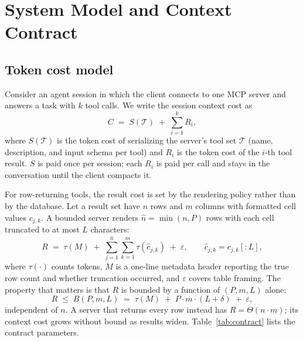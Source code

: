 \section{System Model and Context Contract}\label{sec:system-model}

\subsection{Token cost model}

Consider an agent session in which the client connects to one MCP server and answers a task with $k$ tool calls. We write the session context cost as
\begin{equation}
C \;=\; S(\mathcal{T}) \;+\; \sum_{i=1}^{k} R_i ,
\label{eq:session}
\end{equation}
where $S(\mathcal{T})$ is the token cost of serializing the server's tool set $\mathcal{T}$ (name, description, and input schema per tool) and $R_i$ is the token cost of the $i$-th tool result. $S$ is paid once per session; each $R_i$ is paid per call and stays in the conversation until the client compacts it.

For row-returning tools, the result cost is set by the rendering policy rather than by the database. Let a result set have $n$ rows and $m$ columns with formatted cell values $c_{j,k}$. A bounded server renders $\hat{n} = \min(n, P)$ rows with each cell truncated to at most $L$ characters:
\begin{equation}
R \;=\; \tau(M) \;+\; \sum_{j=1}^{\hat{n}} \sum_{k=1}^{m} \tau\!\left(\hat{c}_{j,k}\right) \;+\; \varepsilon ,
\qquad \hat{c}_{j,k} = c_{j,k}[:L],
\label{eq:result}
\end{equation}
where $\tau(\cdot)$ counts tokens, $M$ is a one-line metadata header reporting the true row count and whether truncation occurred, and $\varepsilon$ covers table framing. The property that matters is that $R$ is bounded by a function of $(P, m, L)$ alone:
\begin{equation}
R \;\le\; B(P, m, L) \;=\; \tau(M) \;+\; P \cdot m \cdot (L + \delta) \;+\; \varepsilon ,
\label{eq:bound}
\end{equation}
independent of $n$. A server that returns every row instead has $R = \Theta(n \cdot m)$; its context cost grows without bound as results widen. Table~\ref{tab:contract} lists the contract parameters.

